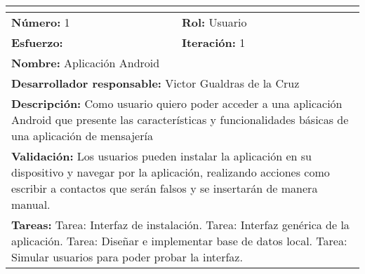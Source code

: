 \begin{tabular}{|p{} |p{} |}
\hline
\multicolumn{2}{|l|}{\cellcolor[HTML]{C0C0C0}{\textbf{Historia de usuario}}} \\ \hline
\textbf{Número:} 1           & \textbf{Rol:} Usuario           \\ \hline
\textbf{Esfuerzo:}          & \textbf{Iteración:} 1         \\ \hline
\multicolumn{2}{|p{0.8\textwidth}|}{\textbf{Nombre:} Aplicación Android } \\ \hline
\multicolumn{2}{|p{0.8\textwidth}|}{\textbf{Desarrollador responsable:} Victor Gualdras de la Cruz} \\ \hline
\multicolumn{2}{|p{0.8\textwidth}|}{\textbf{Descripción:}\newline
Como usuario quiero poder acceder a una aplicación Android que presente las características y funcionalidades básicas de una aplicación de mensajería} \\ \hline
\multicolumn{2}{|p{0.8\textwidth}|}{\textbf{Validación:}\newline
Los usuarios pueden instalar la aplicación en su dispositivo y navegar por la aplicación, realizando acciones como escribir a contactos que serán falsos y se insertarán de manera manual.} \\ \hline
\multicolumn{2}{|p{0.8\textwidth}|}{\textbf{Tareas:}\newline
Tarea: Interfaz de instalación.\newline
Tarea: Interfaz genérica de la aplicación.\newline
Tarea: Diseñar e implementar base de datos local.\newline
Tarea: Simular usuarios para poder probar la interfaz.
}\\ \hline
\end{tabular}